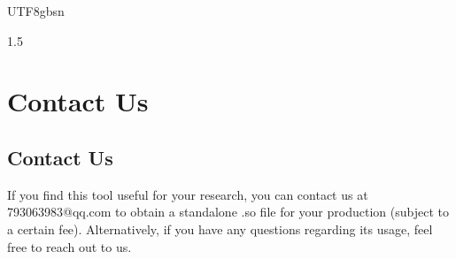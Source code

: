 \documentclass{article}
\begin{document}
\begin{CJK}{UTF8}{gbsn}
\begin{spacing}{1.5}
%



\section{Contact Us}

\subsection{Contact Us}

If you find this tool useful for your research, you can contact us at 793063983@qq.com to obtain a standalone .so file for your production (subject to a certain fee). Alternatively, if you have any questions regarding its usage, feel free to reach out to us.




\end{spacing}
\end{CJK}
\end{document}
